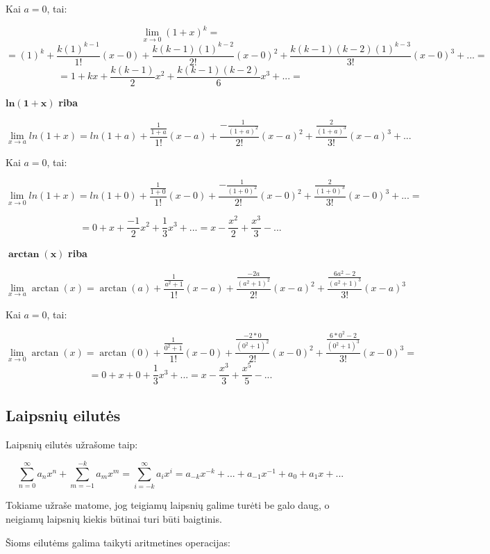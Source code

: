 Kai $a = 0$, tai: 

\[\lim_{x \to 0} (1+x)^k =\]
\[=(1)^k + \frac{k(1)^{k-1}}{1!} (x-0) + \frac{k(k-1)(1)^{k-2}}{2!}(x-0)^2 + \frac{{k(k-1)(k-2)(1)^{k-3}}}{3!}(x-0)^3 + ...  = \]
\[=1 + kx + \frac{k(k-1)}{2}x^2 + \frac{{k(k-1)(k-2)}}{6}x^3 + ...  = \]

$\bm{ln(1+x)}$ \textbf{riba}

\[ \lim_{x \to a} ln(1+x) = ln(1+a) + \frac{\frac{1}{1+a}}{1!}(x-a) + \frac{-\frac{1}{(1+a)^2}}{2!}(x-a)^2 + \frac{\frac{2}{(1+a)^3}}{3!}(x-a)^3 + ... \]

Kai $a = 0$, tai:

\[ \lim_{x \to 0} ln(1+x) = ln(1+0) + \frac{\frac{1}{1+0}}{1!}(x-0) + \frac{-\frac{1}{(1+0)^2}}{2!}(x-0)^2 + \frac{\frac{2}{(1+0)^3}}{3!}(x-0)^3 + ... = \]

\[ = 0 + x + \frac{-1}{2}x^2 + \frac{1}{3}x^3 + ... = x - \frac{x^2}{2} + \frac{x^3}{3} - ...\]

$\bm{\arctan(x)}$ \textbf{riba}

\[\lim_{x \to a} \arctan(x) = \arctan(a) + \frac{\frac{1}{a^2+1}}{1!}(x-a) + \frac{\frac{-2a}{(a^2+1)^2}}{2!}(x-a)^2 + \frac{\frac{6a^2-2}{(a^2+1)^3}}{3!}(x-a)^3 \]

Kai $a = 0$, tai: 

\[\lim_{x \to 0} \arctan(x) = \arctan(0) + \frac{\frac{1}{0^2+1}}{1!}(x-0) + \frac{\frac{-2*0}{(0^2+1)^2}}{2!}(x-0)^2 + \frac{\frac{6*0^2-2}{(0^2+1)^3}}{3!}(x-0)^3 =\]
\[= 0 + x + 0 + \frac{1}{3} x^3 +... = x - \frac{x^3}{3} + \frac{x^5}{5} - ... \]

	
\subsection{Laipsnių eilutės}
	
	Laipsnių eilutės užrašome taip:
	
	\[\sum_{n=0}^{\infty} a_nx^n + \sum_{m=-1}^{-k} a_mx^m = \sum_{i=-k}^{\infty} a_ix^i  = a_{-k} x^{-k} + ... + a_{-1} x^{-1} + a_0 + a_1 x + ... \]
	
	Tokiame užraše matome, jog teigiamų laipsnių galime turėti be galo daug, o neigiamų laipsnių kiekis būtinai turi būti baigtinis.
	
	Šioms eilutėms galima taikyti aritmetines operacijas:
	
